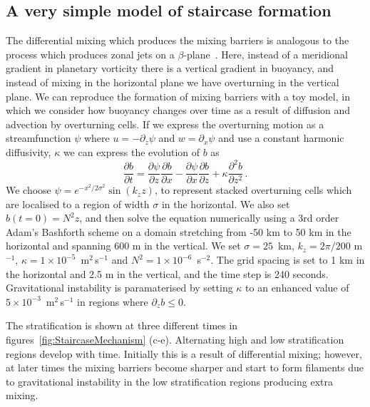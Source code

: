\subsection{A very simple model of staircase formation}
The differential mixing which produces the mixing barriers is analogous to the process which produces zonal jets on a $\beta$-plane~\citep{Manfroi1999}. Here, instead of a meridional gradient in planetary vorticity there is a vertical gradient in buoyancy, and instead of mixing in the horizontal plane we have overturning in the vertical plane. We can reproduce the formation of mixing barriers with a toy model, in which we consider how buoyancy changes over time as a result of diffusion and advection by overturning cells. If we express the overturning motion as a streamfunction $\psi$ where $u = - \partial_z \psi$ and $w = \partial_x \psi$ and use a constant harmonic diffusivity, $\kappa$ we can express the evolution of $b$ as
\begin{equation}
    \frac{\partial b}{\partial t} = \frac{\partial \psi}{\partial z} \frac{\partial b}{\partial x} - \frac{\partial \psi}{\partial x} \frac{\partial b}{\partial z} + \kappa \frac{\partial^2 b}{\partial z^2} \, .
\end{equation}
We choose $\psi = e^{- x^2 / 2\sigma^2} \sin(k_z z)$, to represent stacked overturning cells which are localised to a region of width $\sigma$ in the horizontal. We also set $b(t=0) = N^2 z$, and then solve the equation numerically using a 3rd order Adam's Bashforth scheme on a domain stretching from -50 km to 50 km in the horizontal and spanning 600 m in the vertical. We set $\sigma = 25$~km, $k_z = 2 \pi / 200$ m$^{-1}$, $\kappa = 1 \times 10^{-5}$~m$^2$\,s$^{-1}$ and $N^2 = 1 \times 10^{-6}$~s$^{-2}$. The grid spacing is set to 1 km in the horizontal and 2.5 m in the vertical, and the time step is 240 seconds. Gravitational instability is paramaterised by setting $\kappa$ to an enhanced value of $5 \times 10^{-3}$~m$^2$\,s$^{-1}$ in regions where $\partial_z b \leq 0$.

The stratification is shown at three different times in figures~\ref{fig:StaircaseMechanism} (c-e). Alternating high and low stratification regions develop with time. Initially this is a result of differential mixing; however, at later times the mixing barriers become sharper and start to form filaments due to gravitational instability in the low stratification regions producing extra mixing.

